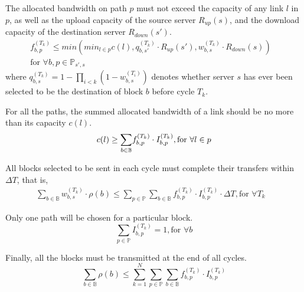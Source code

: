 \begin{packeditemize}
\item The allocated bandwidth on path $p$ must not exceed the
capacity of any link $l$ in $p$, as well as the upload capacity of
the source server $R_{up}(s)$, and the download capacity of the
destination server $R_{down}(s')$.
\begin{equation}
\begin{split}
f^{(T_k)}_{b,p} \leq min\left(min_{l\in p} c(l),
q_{b,s'}^{(T_k)}\cdot R_{up}(s'),
w_{b,s}^{(T_k)}\cdot R_{down}(s)\right) &\\
\text{for }\forall b, p\in \mathbb{P}_{s',s} &
\end{split}
\end{equation}
where $q_{b,s}^{(T_k)} = 1-\prod_{i<k} (1-w_{b,s}^{(T_i)})$ denotes
whether server $s$ has ever been selected to be the destination of
block $b$ before cycle $T_k$.

\item For all the paths, the summed allocated bandwidth of a link
should be no more than its capacity $c(l)$.
\begin{equation}
c(l) \geq \displaystyle{\sum_{b \in \mathbb{B}}}
f^{(T_k)}_{b,p}\cdot I^{(T_k)}_{b,p},
\text{for }\forall l\in p\\
\end{equation}

\item All blocks selected to be sent in each cycle must complete
their transfers within $\Delta T$, that is,
\begin{equation}
\begin{split}
\displaystyle{\sum_{b \in \mathbb{B}}} w_{b,s}^{(T_k)} \cdot \rho(b)
\leq \displaystyle{\sum_{p\in \mathbb{P}}}
\displaystyle{\sum_{b \in \mathbb{B}}} f^{(T_k)}_{b,p} \cdot
I^{(T_k)}_{b,p} \cdot \Delta T,
\text{for }\forall T_k &
\end{split}
\end{equation}

\item Only one path will be chosen for a particular block.
\begin{equation}
\displaystyle{\sum_{p \in \mathbb{P}}} I^{(T_k)}_{b,p} = 1, \text{for }\forall b
\end{equation}

\item Finally, all the blocks must be transmitted at the end of all
cycles.
\begin{equation}
\displaystyle{\sum_{b\in \mathbb{B}}} \rho(b) \leq
\displaystyle{\sum_{k=1}^{N}}
\displaystyle{\sum_{p\in \mathbb{P}}}
\displaystyle{\sum_{b\in \mathbb{B}}}
f_{b,p}^{(T_k)} \cdot I_{b,p}^{(T_k)}
\end{equation}
\end{packeditemize}


